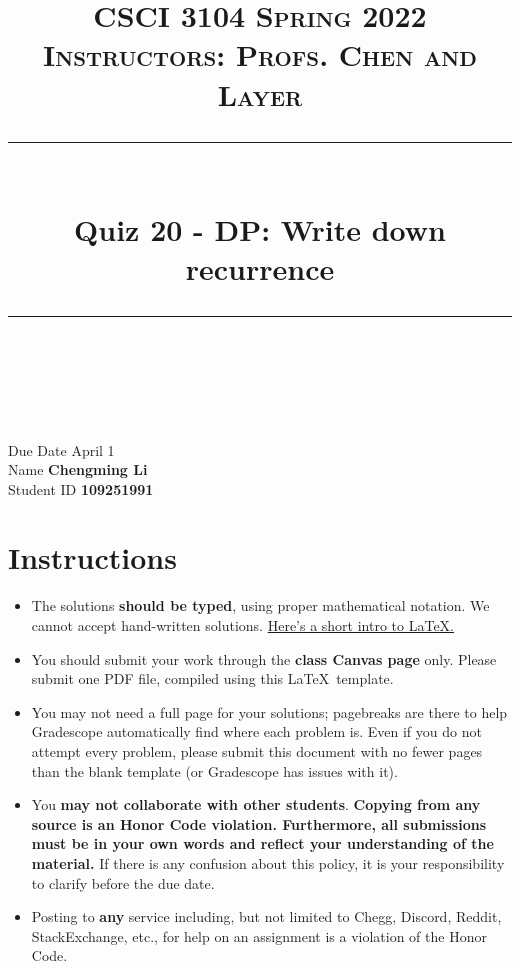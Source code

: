 \documentclass[11pt]{article}
\title{
\normalfont \normalsize 
\textsc{CSCI 3104 Spring 2022 \\ 
Instructors: Profs. Chen and Layer} \\
[10pt] 
\rule{\linewidth}{0.5pt} \\[6pt] 
\huge Quiz 20 - DP: Write down recurrence \\
\rule{\linewidth}{2pt}  \\[10pt]
}
\date{}
\theoremstyle{definition}
\theoremstyle{definition}
\theoremstyle{definition}
\begin{document}

\maketitle


\noindent
Due Date \dotfill April 1 \\
Name \dotfill \textbf{Chengming Li} \\
Student ID \dotfill \textbf{109251991} \\


\tableofcontents

\section{Instructions}
 \begin{itemize}
	\item The solutions \textbf{should be typed}, using proper mathematical notation. We cannot accept hand-written solutions. \href{http://ece.uprm.edu/~caceros/latex/introduction.pdf}{Here's a short intro to \LaTeX.}
	\item You should submit your work through the \textbf{class Canvas page} only. Please submit one PDF file, compiled using this \LaTeX \ template.
	\item You may not need a full page for your solutions; pagebreaks are there to help Gradescope automatically find where each problem is. Even if you do not attempt every problem, please submit this document with no fewer pages than the blank template (or Gradescope has issues with it).

	\item You \textbf{may not collaborate with other students}. \textbf{Copying from any source is an Honor Code violation. Furthermore, all submissions must be in your own words and reflect your understanding of the material.} If there is any confusion about this policy, it is your responsibility to clarify before the due date. 

	\item Posting to \textbf{any} service including, but not limited to Chegg, Discord, Reddit, StackExchange, etc., for help on an assignment is a violation of the Honor Code.
\end{itemize}
\end{document}
